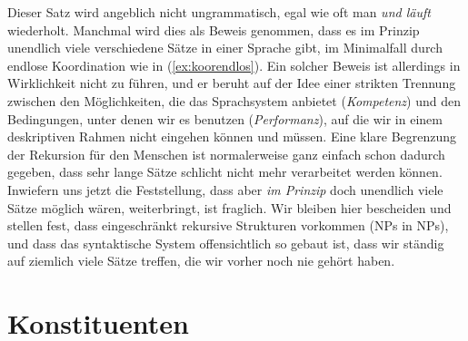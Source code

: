 \begin{exe}
\end{exe}

Dieser Satz wird angeblich nicht ungrammatisch, egal wie oft man \textit{und läuft} wiederholt.
Manchmal wird dies als Beweis genommen, dass es im Prinzip unendlich viele verschiedene Sätze in einer Sprache gibt, im Minimalfall durch endlose Koordination wie in (\ref{ex:koorendlos}).
Ein solcher Beweis ist allerdings in Wirklichkeit nicht zu führen, und er beruht auf der Idee einer strikten Trennung zwischen den Möglichkeiten, die das Sprachsystem anbietet (\textit{Kompetenz}) und den Bedingungen, unter denen wir es benutzen (\textit{Performanz}), auf die wir in einem deskriptiven Rahmen nicht eingehen können und müssen.
Eine klare Begrenzung der Rekursion für den Menschen ist normalerweise ganz einfach schon dadurch gegeben, dass sehr lange Sätze schlicht nicht mehr verarbeitet werden können.
Inwiefern uns jetzt die Feststellung, dass aber \textit{im Prinzip} doch unendlich viele Sätze möglich wären, weiterbringt, ist fraglich.
Wir bleiben hier bescheiden und stellen fest, dass eingeschränkt rekursive Strukturen vorkommen (\zB NPs in NPs), und dass das syntaktische System offensichtlich so gebaut ist, dass wir ständig auf ziemlich viele Sätze treffen, die wir vorher noch nie gehört haben.



\section{Konstituenten}

\label{sec:satzglieder}

